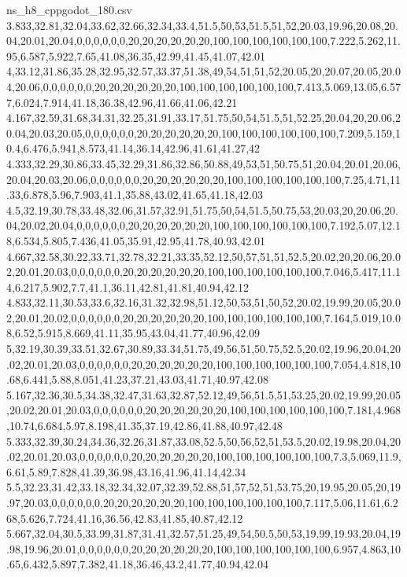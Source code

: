 \begin{filecontents*}[overwrite]{ns_h8_cppgodot_180.csv}
3.833,32.81,32.04,33.62,32.66,32.34,33.4,51.5,50,53,51.5,51,52,20.03,19.96,20.08,20.04,20.01,20.04,0,0,0,0,0,0,20,20,20,20,20,20,100,100,100,100,100,100,7.222,5.262,11.95,6.587,5.922,7.65,41.08,36.35,42.99,41.45,41.07,42.01
4,33.12,31.86,35.28,32.95,32.57,33.37,51.38,49,54,51,51,52,20.05,20,20.07,20.05,20.04,20.06,0,0,0,0,0,0,20,20,20,20,20,20,100,100,100,100,100,100,7.413,5.069,13.05,6.577,6.024,7.914,41.18,36.38,42.96,41.66,41.06,42.21
4.167,32.59,31.68,34.31,32.25,31.91,33.17,51.75,50,54,51.5,51,52.25,20.04,20,20.06,20.04,20.03,20.05,0,0,0,0,0,0,20,20,20,20,20,20,100,100,100,100,100,100,7.209,5.159,10.4,6.476,5.941,8.573,41.14,36.14,42.96,41.61,41.27,42
4.333,32.29,30.86,33.45,32.29,31.86,32.86,50.88,49,53,51,50.75,51,20.04,20.01,20.06,20.04,20.03,20.06,0,0,0,0,0,0,20,20,20,20,20,20,100,100,100,100,100,100,7.25,4.71,11.33,6.878,5.96,7.903,41.1,35.88,43.02,41.65,41.18,42.03
4.5,32.19,30.78,33.48,32.06,31.57,32.91,51.75,50,54,51.5,50.75,53,20.03,20,20.06,20.04,20.02,20.04,0,0,0,0,0,0,20,20,20,20,20,20,100,100,100,100,100,100,7.192,5.07,12.18,6.534,5.805,7.436,41.05,35.91,42.95,41.78,40.93,42.01
4.667,32.58,30.22,33.71,32.78,32.21,33.35,52.12,50,57,51,51,52.5,20.02,20,20.06,20.02,20.01,20.03,0,0,0,0,0,0,20,20,20,20,20,20,100,100,100,100,100,100,7.046,5.417,11.14,6.217,5.902,7.7,41.1,36.11,42.81,41.81,40.94,42.12
4.833,32.11,30.53,33.6,32.16,31.32,32.98,51.12,50,53,51,50,52,20.02,19.99,20.05,20.02,20.01,20.02,0,0,0,0,0,0,20,20,20,20,20,20,100,100,100,100,100,100,7.164,5.019,10.08,6.52,5.915,8.669,41.11,35.95,43.04,41.77,40.96,42.09
5,32.19,30.39,33.51,32.67,30.89,33.34,51.75,49,56,51,50.75,52.5,20.02,19.96,20.04,20.02,20.01,20.03,0,0,0,0,0,0,20,20,20,20,20,20,100,100,100,100,100,100,7.054,4.818,10.68,6.441,5.88,8.051,41.23,37.21,43.03,41.71,40.97,42.08
5.167,32.36,30.5,34.38,32.47,31.63,32.87,52.12,49,56,51.5,51,53.25,20.02,19.99,20.05,20.02,20.01,20.03,0,0,0,0,0,0,20,20,20,20,20,20,100,100,100,100,100,100,7.181,4.968,10.74,6.684,5.97,8.198,41.35,37.19,42.86,41.88,40.97,42.48
5.333,32.39,30.24,34.36,32.26,31.87,33.08,52.5,50,56,52,51,53.5,20.02,19.98,20.04,20.02,20.01,20.03,0,0,0,0,0,0,20,20,20,20,20,20,100,100,100,100,100,100,7.3,5.069,11.9,6.61,5.89,7.828,41.39,36.98,43.16,41.96,41.14,42.34
5.5,32.23,31.42,33.18,32.34,32.07,32.39,52.88,51,57,52,51,53.75,20,19.95,20.05,20,19.97,20.03,0,0,0,0,0,0,20,20,20,20,20,20,100,100,100,100,100,100,7.117,5.06,11.61,6.268,5.626,7.724,41.16,36.56,42.83,41.85,40.87,42.12
5.667,32.04,30.5,33.99,31.87,31.41,32.57,51.25,49,54,50.5,50,53,19.99,19.93,20.04,19.98,19.96,20.01,0,0,0,0,0,0,20,20,20,20,20,20,100,100,100,100,100,100,6.957,4.863,10.65,6.432,5.897,7.382,41.18,36.46,43.2,41.77,40.94,42.04

\end{filecontents*}
